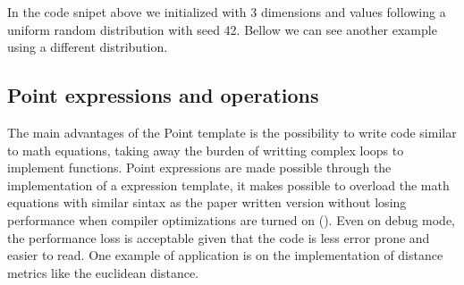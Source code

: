 \documentclass[letterpaper,10pt,english]{sphinxmanual}
\begin{document}
\begin{sphinxVerbatim}[commandchars=\\\{\}]
 

  
\end{sphinxVerbatim}

\sphinxAtStartPar
In the code snipet above we initialized  with 3 dimensions and values following a uniform random distribution with seed 42.
Bellow we can see another example using a different distribution.

\begin{sphinxVerbatim}[commandchars=\\\{\}]
 

      
\end{sphinxVerbatim}


\subsection{Point expressions and operations}
\label{\detokenize{getting_started/datamanagement:point-expressions-and-operations}}
\sphinxAtStartPar
The main advantages of the Point template is the possibility to write code similar to math equations, taking away the burden of writting complex loops
to implement functions. Point expressions are made possible through the implementation of a expression template, it makes possible to overload the math equations
with similar sintax as the paper written version without losing performance when compiler optimizations are turned on (). Even on debug mode, the performance loss is acceptable
given that the code is less error prone and easier to read. One example of application is on the implementation of distance metrics like the euclidean distance.
\end{document}
